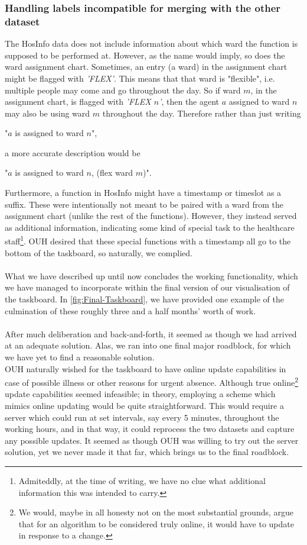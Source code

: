 \subsubsection*{Handling labels incompatible for merging with the other dataset}
The HosInfo data does not include information about which ward the \gls{function} is supposed to be performed at. However, as the name would imply, so does the ward assignment chart. Sometimes, an entry (a ward) in the assignment chart might be flagged with \emph{'FLEX'}. This means that that ward is "flexible", i.e. multiple people may come and go throughout the day. So if ward \(m\), in the assignment chart, is flagged with \emph{'FLEX \(n\)'}, then the agent \(a\) assigned to ward \(n\) may also be using ward \(m\) throughout the day. Therefore rather than just writing
\begin{center}
    "\(a\) is assigned to ward \(n\)",
\end{center}
a more accurate description would be
\begin{center}
    "\(a\) is assigned to ward \(n\), (flex ward \(m\))".
\end{center} 
Furthermore, a \gls{function} in HosInfo might have a timestamp or timeslot as a suffix. These were intentionally not meant to be paired with a ward from the assignment chart (unlike the rest of the \gls{functions}). However, they instead served as additional information, indicating some kind of special task to the healthcare staff\footnote{Admiteddly, at the time of writing, we have no clue what additional information this was intended to carry.}. OUH desired that these special functions with a timestamp all go to the bottom of the taskboard, so naturally, we complied.
\\
\\
What we have described up until now concludes the working functionality, which we have managed to incorporate within the final version of our visualisation of the taskboard. In \autoref{fig:Final-Taskboard}, we have provided one example of the culmination of these roughly three and a half months' worth of work.
\\
\\
After much deliberation and back-and-forth, it seemed as though we had arrived at an adequate solution. Alas, we ran into one final major roadblock, for which we have yet to find a reasonable solution.
\\
OUH naturally wished for the taskboard to have online update capabilities in case of possible illness or other reasons for urgent absence. Although true online\footnote{We would, maybe in all honesty not on the most substantial grounds, argue that for an algorithm to be considered truly online, it would have to update in response to a change.} update capabilities seemed infeasible; in theory, employing a scheme which mimics online updating would be quite straightforward. This would require a server which could run at set intervals, say every 5 minutes, throughout the working hours, and in that way, it could reprocess the two datasets and capture any possible updates. It seemed as though OUH was willing to try out the server solution, yet we never made it that far, which brings us to the final roadblock.
